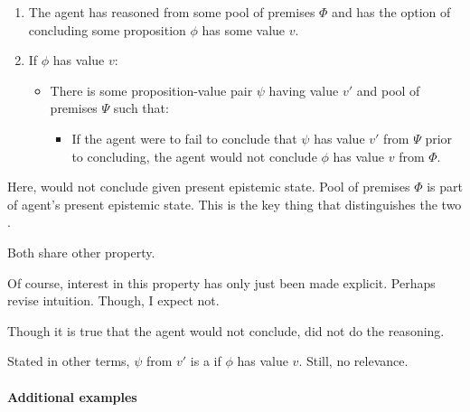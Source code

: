 \begin{note}
  \begin{enumerate}
  \item
    The agent has reasoned from some pool of premises \(\Phi\) and has the option of concluding some proposition \(\phi\) has some value \(v\).
  \item
    If \(\phi\) has value \(v\):
    \begin{itemize}
    \item
      There is some proposition-value pair \(\psi\) having value \(v'\) and pool of premises \(\Psi\) such that:
      \begin{itemize}
      \item
        If the agent were to fail to conclude that \(\psi\) has value \(v'\) from \(\Psi\) prior to concluding, the agent would not conclude \(\phi\) has value \(v\) from \(\Phi\).
      \end{itemize}
    \end{itemize}
  \end{enumerate}

  Here, would not conclude given present epistemic state.
  Pool of premises \(\Phi\) is part of agent's present epistemic state.
  This is the key thing that distinguishes the two .

  Both  share other property.

  Of course, interest in this property has only just been made explicit.
  Perhaps revise intuition.
  Though, I expect not.

  Though it is true that the agent would not conclude, did not do the reasoning.

  Stated in other terms, \(\psi\) from \(v'\) is a \fc{} if \(\phi\) has value \(v\).
  Still, no relevance.
\end{note}

\paragraph{Additional examples}

